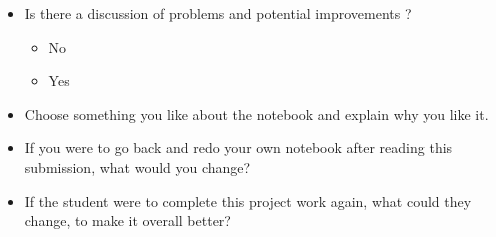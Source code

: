 \documentclass[a4paper,11pt]{article}
\begin{document}
\begin{itemize}
\item Is there a discussion of problems and potential improvements ?
  \begin{itemize}
  \item No
  \item Yes
  \end{itemize}

\item Choose something you like about the notebook and explain why you like it. 

\item If you were to go back and redo your own notebook after reading this submission, what would you change?

\item If the student were to complete this project work again, what could they change, to make it overall better?
\end{itemize}
\end{document}

